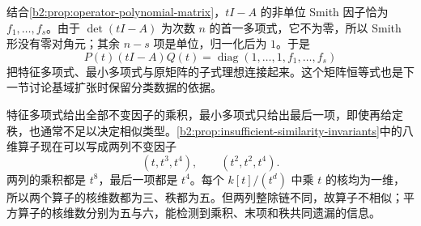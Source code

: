 \ProseParagraphBreak
结合\cref{b2:prop:operator-polynomial-matrix}，\(tI-A\) 的非单位 Smith 因子恰为 \(f_1,\ldots,f_s\)。由于 \(\det(tI-A)\) 为次数 \(n\) 的首一多项式，它不为零，所以 Smith 形没有零对角元；其余 \(n-s\) 项是单位，归一化后为 \(1\)。于是
\[
	P(t)(tI-A)Q(t)=\operatorname{diag}(1,\ldots,1,f_1,\ldots,f_s)
\]
把特征多项式、最小多项式与原矩阵的子式理想连接起来。这个矩阵恒等式也是下一节讨论基域扩张时保留分类数据的依据。

\ProseParagraphBreak
特征多项式给出全部不变因子的乘积，最小多项式只给出最后一项，即使再给定秩，也通常不足以决定相似类型。\cref{b2:prop:insufficient-similarity-invariants}中的八维算子现在可以写成两列不变因子
\[
	(t,t^3,t^4),\qquad (t^2,t^2,t^4).
\]
两列的乘积都是 \(t^8\)，最后一项都是 \(t^4\)。每个 \(k[t]/(t^d)\) 中乘 \(t\) 的核均为一维，所以两个算子的核维数都为三、秩都为五。但两列整除链不同，故算子不相似；平方算子的核维数分别为五与六，能检测到乘积、末项和秩共同遗漏的信息。
